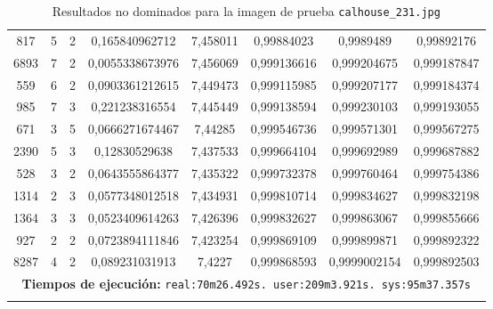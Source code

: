 \begin{longtable}{|c|c|c|c|c|c|c|c|}
817 & 5 & 2 & 0,165840962712 & 7,458011 & 0,99884023 & 0,9989489 & 0,99892176 \\
6893 & 7 & 2 & 0,0055338673976 & 7,456069 & 0,999136616 & 0,999204675 & 0,999187847 \\
559 & 6 & 2 & 0,0903361212615 & 7,449473 & 0,999115985 & 0,999207177 & 0,999184374 \\
985 & 7 & 3 & 0,221238316554 & 7,445449 & 0,999138594 & 0,999230103 & 0,999193055 \\
671 & 3 & 5 & 0,0666271674467 & 7,44285 & 0,999546736 & 0,999571301 & 0,999567275 \\
2390 & 5 & 3 & 0,12830529638 & 7,437533 & 0,999664104 & 0,999692989 & 0,999687882 \\
528 & 3 & 2 & 0,0643555864377 & 7,435322 & 0,999732378 & 0,999760464 & 0,999754386 \\
1314 & 2 & 3 & 0,0577348012518 & 7,434931 & 0,999810714 & 0,999834627 & 0,999832198 \\
1364 & 3 & 3 & 0,0523409614263 & 7,426396 & 0,999832627 & 0,999863067 & 0,999855666 \\
927 & 2 & 2 & 0,0723894111846 & 7,423254 & 0,999869109 & 0,999899871 & 0,999892322 \\
8287 & 4 & 2 & 0,089231031913 & 7,4227 & 0,999868593 & 0,9999002154 & 0,999892503 \\
\hline
\multicolumn{8}{|c|}{\textbf{Tiempos de ejecución:} \texttt{real:70m26.492s. user:209m3.921s. sys:95m37.357s}}\\ \hline
\caption{Resultados no dominados para la imagen de prueba \texttt{calhouse\_231.jpg}}
\label{tab:calhouse_231}
\end{longtable}
\normalsize

